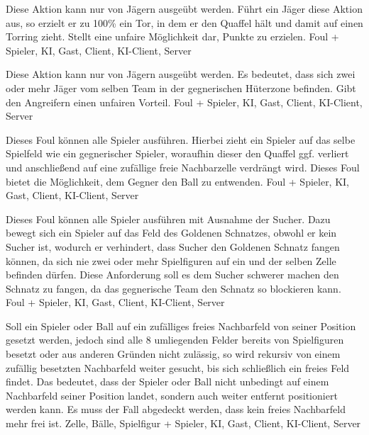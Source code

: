         {Diese Aktion kann nur von Jägern ausgeübt werden. Führt ein Jäger diese Aktion aus, so erzielt er zu 100\% ein Tor, in dem er den Quaffel hält und damit auf einen Torring zieht.}
        {Stellt eine unfaire Möglichkeit dar, Punkte zu erzielen.}
        {Foul}
        {+}
        {Spieler, KI, Gast, Client, KI-Client, Server}

        {Diese Aktion kann nur von Jägern ausgeübt werden. Es bedeutet, dass sich zwei oder mehr Jäger vom selben Team in der gegnerischen Hüterzone befinden.}
        {Gibt den Angreifern einen unfairen Vorteil.}
        {Foul}
        {+}
        {Spieler, KI, Gast, Client, KI-Client, Server}

        {Dieses Foul können alle Spieler ausführen. Hierbei zieht ein Spieler auf das selbe Spielfeld wie ein gegnerischer Spieler, woraufhin dieser den Quaffel ggf. verliert und anschließend auf eine zufällige freie Nachbarzelle verdrängt wird.}
        {Dieses Foul bietet die Möglichkeit, dem Gegner den Ball zu entwenden.}
        {Foul}
        {+}
        {Spieler, KI, Gast, Client, KI-Client, Server}

        {Dieses Foul können alle Spieler ausführen mit Ausnahme der Sucher. Dazu bewegt sich ein Spieler auf das Feld des Goldenen Schnatzes, obwohl er kein Sucher ist, wodurch er verhindert, dass Sucher den Goldenen Schnatz fangen können, da sich nie zwei oder mehr Spielfiguren auf ein und der selben Zelle befinden dürfen.}
        {Diese Anforderung soll es dem Sucher schwerer machen den Schnatz zu fangen, da das gegnerische Team den Schnatz so blockieren kann.}
        {Foul}
        {+}
        {Spieler, KI, Gast, Client, KI-Client, Server}
        
        {Soll ein Spieler oder Ball auf ein zufälliges freies Nachbarfeld von seiner Position gesetzt werden, jedoch sind alle 8 umliegenden Felder bereits von Spielfiguren besetzt oder aus anderen Gründen nicht zulässig, so wird rekursiv von einem zufällig besetzten Nachbarfeld weiter gesucht, bis sich schließlich ein freies Feld findet. Das bedeutet, dass der Spieler oder Ball nicht unbedingt auf einem Nachbarfeld seiner Position landet, sondern auch weiter entfernt positioniert werden kann.}
        {Es muss der Fall abgedeckt werden, dass kein freies Nachbarfeld mehr frei ist.}
        {Zelle, Bälle, Spielfigur}
        {+}
        {Spieler, KI, Gast, Client, KI-Client, Server}



